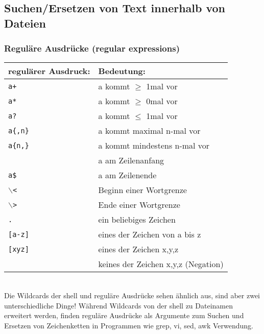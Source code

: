 \documentclass[11pt]{article}
\begin{document}
\subsection{Suchen/Ersetzen von Text innerhalb von Dateien} 
\subsubsection{Reguläre Ausdrücke (regular expressions)}
\begin{tabular}{|l|l|}
\hline
regulärer Ausdruck: & Bedeutung:\\
\hline
\texttt{a+} & a kommt $\ge$ 1mal vor \\
\texttt{a*} & a kommt $\ge$ 0mal vor \\
\texttt{a?} & a kommt $\le$ 1mal vor \\
\texttt{a\{,n\}} & a kommt maximal n-mal vor \\
\texttt{a\{n,\}} & a kommt mindestens n-mal vor \\
\verb1^a1 & a am Zeilenanfang \\
\texttt{a\$} & a am Zeilenende \\
\texttt{$\backslash$<} & Beginn einer Wortgrenze \\
\texttt{$\backslash$>} & Ende einer Wortgrenze \\
\texttt{.} & ein beliebiges Zeichen \\
\texttt{[a-z]} & eines der Zeichen von a bis z \\
\texttt{[xyz]} & eines der Zeichen x,y,z \\
\verb1[^xyz]1 & keines der Zeichen x,y,z (Negation)\\
\hline
\end{tabular}\\

Die Wildcards der shell und reguläre Ausdrücke  sehen ähnlich aus,
sind aber zwei unterschiedliche Dinge! Während Wildcards von der shell
zu Dateinamen erweitert werden, finden reguläre Ausdrücke als Argumente
zum Suchen und Ersetzen von Zeichenketten in Programmen wie grep, vi, sed,
awk Verwendung.\\  
\end{document}
